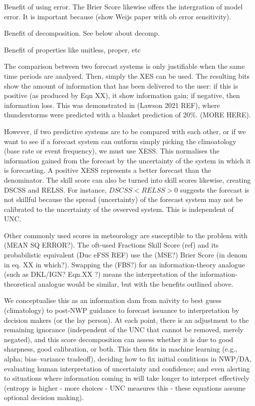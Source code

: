 \documentclass[draft]{ametsoc}
\begin{document}
Benefit of using error. The Brier Score likewise offers the intergration of model error. It is important because (show Weijs paper with ob error sensitivity).

Benefit of decomposition. See below about decomp.

Benefit of properties like unitless, proper, etc

The comparison between two forecast systems is only justifiable when the same time periods are analysed. Then, simply the XES can be used. The resulting bits show the amount of information that has been delivered to the user: if this is positive (as produced by Eqn XX), it show information gain; if negative, then information loss. This was demonstrated in (Lawson 2021 REF), where thunderstorms were predicted with a blanket prediction of 20\%. (MORE HERE). 

However, if two predictive systems are to be compared with each other, or if we want to see if a forecast system can outform simply picking the climoatology (base rate or event frequency), we must use XESS. This normalises the information gained from the forecast by the uncertainty of the system in which it is forecasting. A positive XESS represents a better forecast than the denominator. The skill score can also be turned into skill scores likewise, creating DSCSS and RELSS. For instance, $ DSCSS < RELSS > 0$ suggests the forecast is not skillful because the spread (uncertainty) of the forecast system may not be calibrated to the uncertainty of the ovserved system. This is independent of UNC.

Other commonly used scores in meteorology are susceptible to the problem with (MEAN SQ ERROR?). The oft-used Fractions Skill Score (ref) and its probabilistic equivalent (Duc eFSS REF) use the (MSE?) Brier Score (in denom in eq. XX in which?). Swapping the (FBS?) for an information-theory analogue (such as DKL/IGN? Eqn.XX ?) means the interpretation of the information-theoretical analogue would be similar, but with the benefits outlined above.

We conceptualise this as an information dam from na\"ivity to best guess (climatology) to post-NWP guidance to forecast issuance to interpretation by decision makers (or the lay person). At each point, there is an adjustment to the remaining ignorance (independent of the UNC that cannot be removed, merely negated), and this score decomposition can assess whether it is due to good sharpness, good calibration, or both. This then fits in machine learning (e.g., alpha; bias--variance tradeoff), deciding how to fix initial conditions in NWP/DA, evaluating human interpretation of uncertainty and confidence; and even alerting to situations where information coming in will take longer to interpret effectively (entropy is higher - more choices - UNC measures this - these equations assume optional decision making).
\end{document}
